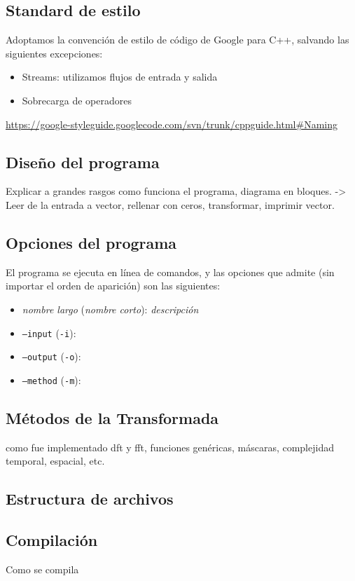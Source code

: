 \documentclass{article}
\begin{document}
  \subsection{Standard de estilo}
    Adoptamos la convención de estilo de código de Google para C++, salvando las siguientes excepciones:
    \begin{itemize}
      \item Streams: utilizamos flujos de entrada y salida
      \item Sobrecarga de operadores
    \end{itemize}
    \url{https://google-styleguide.googlecode.com/svn/trunk/cppguide.html#Naming}

  \subsection{Diseño del programa}
    Explicar a grandes rasgos como funciona el programa, diagrama en bloques.
    -> Leer de la entrada a vector, rellenar con ceros, transformar, imprimir vector.

  \subsection{Opciones del programa}
    El programa se ejecuta en línea de comandos, y las opciones que admite (sin importar el orden de aparición) son las siguientes:
    \begin{itemize}
      \item[] \textit{nombre largo} (\textit{nombre corto}): \textit{descripción}
      \item \texttt{--input} (\texttt{-i}): 
      \item \texttt{--output} (\texttt{-o}):
      \item \texttt{--method} (\texttt{-m}):
    \end{itemize}

  \subsection{Métodos de la Transformada}
    como fue implementado dft y fft, funciones genéricas, máscaras, complejidad temporal, espacial, etc.

  \subsection{Estructura de archivos}

  \subsection{Compilación}
  Como se compila
\end{document}
